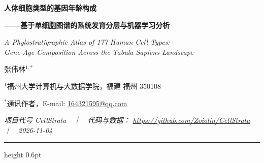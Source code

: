 \documentclass[UTF8, a4paper, 11pt]{ctexart}
\begin{document}
\begin{center}
  {\LARGE\bfseries 人体细胞类型的基因年龄构成\par}
  \vspace{0.3em}
  {\large\bfseries ——基于单细胞图谱的系统发育分层与机器学习分析\par}
  \vspace{0.6em}
  {\normalsize\itshape A Phylostratigraphic Atlas of 177 Human Cell Types:\\
   Gene-Age Composition Across the Tabula Sapiens Landscape\par}
\end{center}

\vspace{0.7em}

\begin{center}
  {\normalsize 张伟林$^{1,\ast}$}\\[0.2em]
  {\small $^{1}$福州大学计算机与大数据学院，福建 福州 350108\par}
  \vspace{0.1em}
  {\footnotesize $^{\ast}$通讯作者，E-mail: \href{mailto:164321595@qq.com}{164321595@qq.com}\par}
\end{center}

\vspace{0.35em}
\begin{center}
  {\footnotesize\itshape 项目代号 CellStrata　｜　代码与数据：
   \url{https://github.com/Zviolin/CellStrata}　｜　2026-11-04}
\end{center}

\vspace{0.3em}
\hrule height 0.6pt
\vspace{0.6em}
\end{document}
